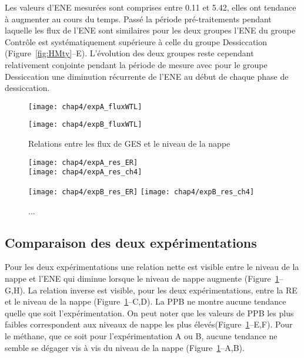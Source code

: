 Les valeurs d'ENE mesurées sont comprises entre \num{0.11} et \SI{5.42}{\uml}, elles ont tendance à augmenter au cours du temps.
Passé la période pré-traitements pendant laquelle les flux de l'ENE sont similaires pour les deux groupes l'ENE du groupe Contrôle est systématiquement supérieure à celle du groupe Dessiccation (Figure~\ref{fig:HMty}--E).
L'évolution des deux groupes reste cependant relativement conjointe pendant la période de mesure avec pour le groupe Dessiccation une diminution récurrente de l'ENE au début de chaque phase de dessiccation.

\begin{figure}
\centering
\begin{minipage}{.5\textwidth}
\centering
\texttt{[image: chap4/expA\_fluxWTL]}
\end{minipage}%
\begin{minipage}{.5\textwidth}
\centering
\texttt{[image: chap4/expB\_fluxWTL]}
\end{minipage}%
\caption{Relations entre les flux de GES et le niveau de la nappe}
\label{fig:hm_wtl}
\end{figure}

\begin{figure}[!tbp]
\centering
\hspace*{-2cm}
\begin{minipage}[]{.55\textwidth}
\texttt{[image: chap4/expA\_res\_ER]}\\
\texttt{[image: chap4/expA\_res\_ch4]}
\end{minipage}
\hspace*{.1cm}
\begin{minipage}[]{.55\textwidth}
\texttt{[image: chap4/expB\_res\_ER]}
\texttt{[image: chap4/expB\_res\_ch4]}
\end{minipage}
\hspace*{-2cm}
\caption{...}
\label{fig:HM_res}
\end{figure}


\subsection{Comparaison des deux expérimentations}

Pour les deux expérimentations une relation nette est visible entre le niveau de la nappe et l'ENE qui diminue lorsque le niveau de nappe augmente (Figure~\ref{fig:hm_wtl}--G,H).
La relation inverse est visible, pour les deux expérimentations, entre la RE et le niveau de la nappe (Figure~\ref{fig:hm_wtl}--C,D).
La PPB ne montre aucune tendance quelle que soit l'expérimentation.
On peut noter que les valeurs de PPB les plus faibles correspondent aux niveaux de nappe les plus élevés(Figure~\ref{fig:hm_wtl}--E,F).
Pour le méthane, que ce soit pour l'expérimentation A ou B, aucune tendance ne semble se dégager vis à vis du niveau de la nappe (Figure~\ref{fig:hm_wtl}--A,B).


